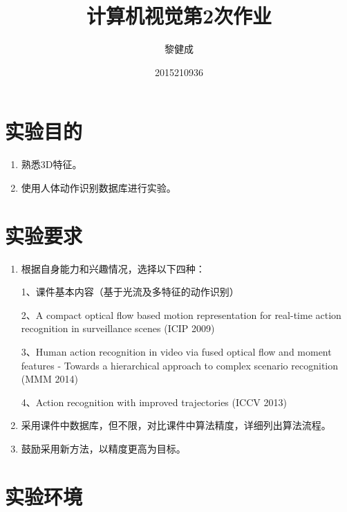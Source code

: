 \documentclass[a4paper, 12pt, UTF8]{article}
\begin{document}
\title{计算机视觉第2次作业}
\author{黎健成}
\date{2015210936}
\maketitle

\section{实验目的}

\begin{enumerate}

\item 熟悉3D特征。

\item 使用人体动作识别数据库进行实验。

\end{enumerate}


\section{实验要求}

\begin{enumerate}

\item 根据自身能力和兴趣情况，选择以下四种：

1、课件基本内容（基于光流及多特征的动作识别）

2、A compact optical flow based motion representation for real-time action recognition in surveillance scenes
(ICIP 2009)

3、Human action recognition in video via fused optical flow and moment features - Towards a hierarchical approach to complex scenario recognition
(MMM 2014)

4、Action recognition with improved trajectories
(ICCV 2013)

\item 采用课件中数据库，但不限，对比课件中算法精度，详细列出算法流程。

\item 鼓励采用新方法，以精度更高为目标。

\end{enumerate}


\section{实验环境}
\end{document}
